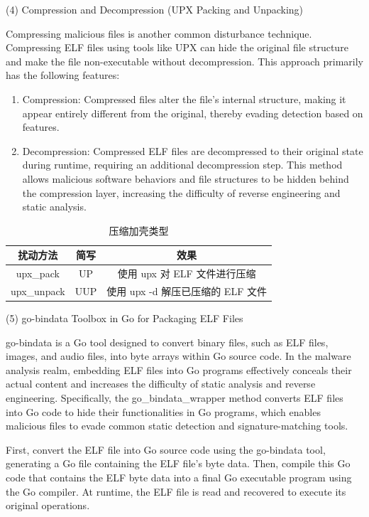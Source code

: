 (4) Compression and Decompression (UPX Packing and Unpacking)

Compressing malicious files is another common disturbance technique. Compressing ELF files using tools like UPX can hide the original file structure and make the file non-executable without decompression. This approach primarily has the following features:
\begin{enumerate}

\item Compression: Compressed files alter the file's internal structure, making it appear entirely different from the original, thereby evading detection based on features.

\item Decompression: Compressed ELF files are decompressed to their original state during runtime, requiring an additional decompression step. This method allows malicious software behaviors and file structures to be hidden behind the compression layer, increasing the difficulty of reverse engineering and static analysis.
\end{enumerate}
\begin{table}[htbp]
	\centering
	\caption{压缩加壳类型}\label{tab:4.4}
	\begin{tabular*}{0.9\textwidth}{@{\extracolsep{\fill}}ccc}
		\toprule
		扰动方法 & 简写 & 效果 \\
		\midrule
		upx\_pack & UP & 使用 upx 对 ELF 文件进行压缩 \\
		upx\_unpack & UUP & 使用 upx -d 解压已压缩的 ELF 文件 \\
		\bottomrule
	\end{tabular*}
\end{table}

(5) go-bindata Toolbox in Go for Packaging ELF Files

go-bindata is a Go tool designed to convert binary files, such as ELF files, images, and audio files, into byte arrays within Go source code. In the malware analysis realm, embedding ELF files into Go programs effectively conceals their actual content and increases the difficulty of static analysis and reverse engineering. Specifically, the go\_bindata\_wrapper method converts ELF files into Go code to hide their functionalities in Go programs, which enables malicious files to evade common static detection and signature-matching tools.

First, convert the ELF file into Go source code using the go-bindata tool, generating a Go file containing the ELF file's byte data. Then, compile this Go code that contains the ELF byte data into a final Go executable program using the Go compiler. At runtime, the ELF file is read and recovered to execute its original operations.

